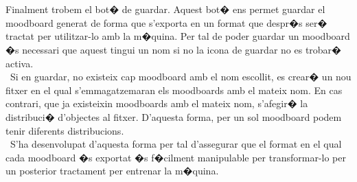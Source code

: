 \documentclass[12pt,a4paper,openright,oneside]{article}
\numberwithin{equation}{section}
\theoremstyle{definition}
\begin{document}
\\\\
Finalment trobem el bot� de guardar. Aquest bot� ens permet guardar el moodboard generat de forma que s'exporta en un format que despr�s ser� tractat per utilitzar-lo amb la m�quina. Per tal de poder guardar un moodboard �s necessari que aquest tingui un nom si no la icona de guardar no es trobar� activa.\\\
Si en guardar, no existeix cap moodboard amb el nom escollit, es crear� un nou fitxer en el qual s'emmagatzemaran els moodboards amb el mateix nom. En cas contrari, que ja existeixin moodboards amb el mateix nom, s'afegir� la distribuci� d'objectes al fitxer. D'aquesta forma, per un sol moodboard podem tenir diferents distribucions.\\\
S'ha desenvolupat d'aquesta forma per tal d'assegurar que el format en el qual cada moodboard �s exportat �s f�cilment manipulable per transformar-lo per un posterior tractament per entrenar la m�quina.
\end{document}
